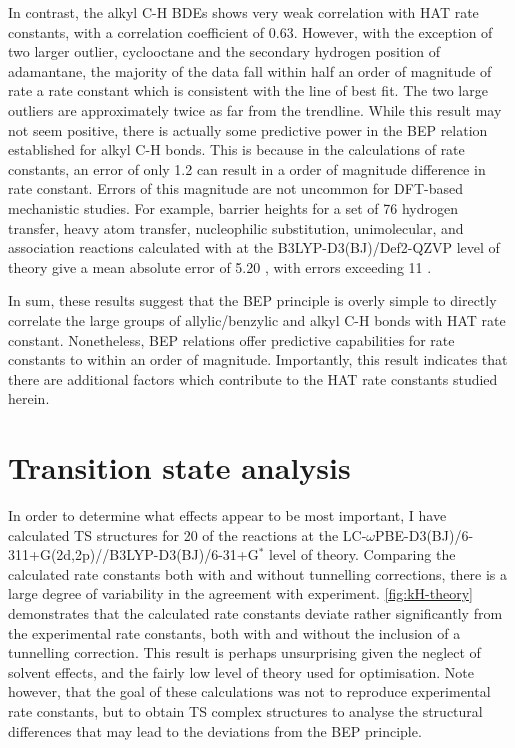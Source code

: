 In contrast, the alkyl C-H BDEs shows very weak correlation with HAT rate constants, with a correlation coefficient of 0.63. However, with the exception of two larger outlier, cyclooctane and the secondary hydrogen position of adamantane, the majority of the data fall within half an order of magnitude of rate a rate constant which is consistent with the line of best fit. The two large outliers are approximately twice as far from the trendline. While this result may not seem positive, there is actually some predictive power in the BEP relation established for alkyl C-H bonds. This is because in the calculations of rate constants, an error of only 1.2 \kcalmol can result in a order of magnitude difference in rate constant. Errors of this magnitude are not uncommon for DFT-based mechanistic studies. For example, barrier heights for a set\cite{Zhao2005, Zhao2009} of 76 hydrogen transfer, heavy atom transfer, nucleophilic substitution, unimolecular, and association reactions calculated with at the B3LYP-D3(BJ)/Def2-QZVP level of theory give a mean absolute error of 5.20 \kcalmol, with errors exceeding 11 \kcalmol.\cite{Goerigk2011}

In sum, these results suggest that the BEP principle is overly simple to directly correlate the large groups of allylic/benzylic and alkyl C-H bonds with HAT rate constant. Nonetheless, BEP relations offer predictive capabilities for rate constants to within an order of magnitude. Importantly, this result indicates that there are additional factors which contribute to the HAT rate constants studied herein.

\section{Transition state analysis}

In order to determine what effects appear to be most important, I have calculated TS structures for 20 of the reactions at the LC-$\omega$PBE-D3(BJ)/6-311+G(2d,2p)//B3LYP-D3(BJ)/6-31+G$^*$ level of theory. Comparing the calculated rate constants both with and without tunnelling corrections, there is a large degree of variability in the agreement with experiment. \ref{fig:kH-theory} demonstrates that the calculated rate constants deviate rather significantly from the experimental rate constants, both with and without the inclusion of a tunnelling correction. This result is perhaps unsurprising given the neglect of solvent effects, and the fairly low level of theory used for optimisation. Note however, that the goal of these calculations was not to reproduce experimental rate constants, but to obtain TS complex structures to analyse the structural differences that may lead to the deviations from the BEP principle.

